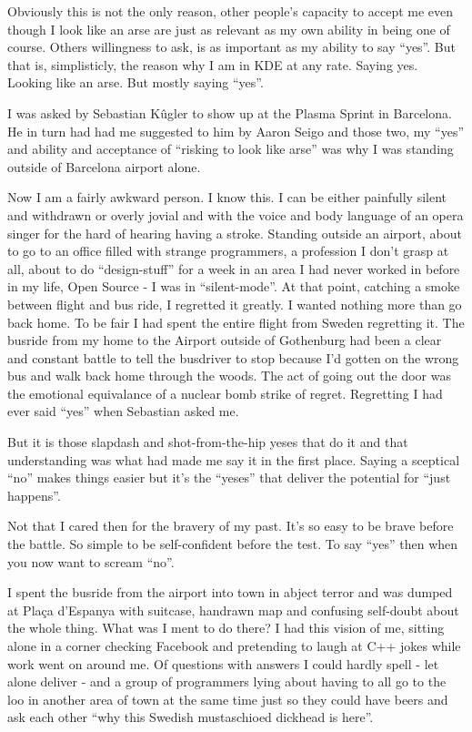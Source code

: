 Obviously this is not the only reason, other people's capacity to accept me even though I look like an arse are just as relevant as my own ability in being one of course. Others willingness to ask, is as important as my ability to say “yes”. But that is, simplisticly, the reason why I am in KDE at any rate. Saying yes. Looking like an arse. But mostly saying “yes”.

I was asked by Sebastian Kûgler to show up at the Plasma Sprint in Barcelona. He in turn had had me suggested to him by Aaron Seigo and those two, my “yes” and ability and acceptance of “risking to look like arse” was why I was standing outside of Barcelona airport alone.

Now I am a fairly awkward person. I know this. I can be either painfully silent and withdrawn or overly jovial and with the voice and body language of an opera singer for the hard of hearing having a stroke. Standing outside an airport, about to go to an office filled with strange programmers, a profession I don’t grasp at all, about to do “design-stuff” for a week in an area I had never worked in before in my life, Open Source - I was in “silent-mode”. 
At that point, catching a smoke between flight and bus ride, I regretted it greatly. I wanted nothing more than go back home. To be fair I had spent the entire flight from Sweden regretting it. The busride from my home to the Airport outside of Gothenburg had been a clear and constant battle to tell the busdriver to stop because I’d gotten on the wrong bus and walk back home through the woods. The act of going out the door was the emotional equivalance of a nuclear bomb strike of regret. Regretting I had ever said “yes” when Sebastian asked me. 

But it is those slapdash and shot-from-the-hip yeses that do it and that understanding was what had made me say it in the first place. Saying a sceptical “no” makes things easier but it’s the “yeses” that deliver the potential for “just happens”.

Not that I cared then for the bravery of my past. It’s so easy to be brave before the battle. So simple to be self-confident before the test. To say “yes” then when you now want to scream “no”.

I spent the busride from the airport into town in abject terror and was dumped at Plaça d'Espanya with suitcase, handrawn map and confusing self-doubt about the whole thing.
What was I ment to do there? I had this vision of me, sitting alone in a corner checking Facebook and pretending to laugh at C++ jokes while work went on around me. Of questions with answers I could hardly spell - let alone deliver - and a group of programmers lying about having to all go to the loo in another area of town at the same time just so they could have beers and ask each other “why this Swedish mustaschioed dickhead is here”. 

